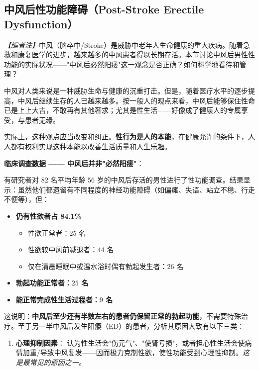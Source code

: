 \begin{enumerate}
\subsection{中风后性功能障碍（Post-Stroke Erectile Dysfunction）}

\noindent\textit{【编者注】}中风（脑卒中/Stroke）是威胁中老年人生命健康的重大疾病。随着急救和康复医学的进步，越来越多的中风患者得以长期存活。本节讨论中风后男性性功能的实际状况——"中风后必然阳痿"这一观念是否正确？如何科学地看待和管理？

\vspace{0.5em}
中风对人类来说是一种威胁生命与健康的沉重打击。但是，随着医疗水平的逐步提高，中风后继续生存的人已越来越多。按一般人的观点来看，中风后能够保住性命已是上上大吉，不敢再有其他奢求；尤其是性生活——好像成了健康人的专属享受，与患者无缘。

实际上，这种观点应当改变和纠正。\textbf{性行为是人的本能}，在健康允许的条件下，人人都有权利实现这种本能以改善生活质量和人生乐趣。

\vspace{0.5em}
\noindent\textbf{临床调查数据 —— 中风后并非"必然阳痿"}：

有研究者对 $82$ 名平均年龄 56 岁的中风后存活的男性进行了性功能调查。结果显示：虽然他们都遗留有不同程度的神经功能障碍（如偏瘫、失语、站立不稳、行走不便等），但：
\begin{itemize}
	\item \textbf{仍有性欲者占 84.1\%}
	\begin{itemize}
		\item 性欲正常者：$25$ 名
		\item 性欲较中风前减退者：$44$ 名
		\item 仅在清晨睡眠中或温水浴时偶有勃起发生者：$26$ 名
	\end{itemize}
	\item \textbf{勃起功能正常者：$25$ 名}
	\item \textbf{能正常完成性生活过程者：$9$ 名}
\end{itemize}

这说明：\textbf{中风后至少还有半数左右的患者仍保留正常的勃起功能}，不需要特殊治疗。至于另一半中风后发生阳痿（ED）的患者，分析其原因大致有以下三类：

\begin{enumerate}
	\item \textbf{心理抑制因素}：
	认为性生活会"伤元气"、"使肾亏损"，或者担心性生活会使病情加重/导致中风复发——因而极力克制性欲，使性功能受到心理性抑制。\textit{这是最常见的原因之一。}


\end{enumerate}
\end{enumerate}
